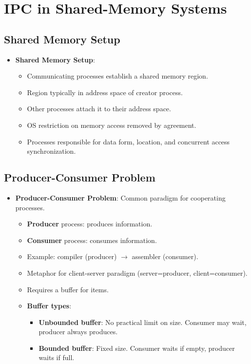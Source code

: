 \section{IPC in Shared-Memory Systems}\label{sec:3.5}

\subsection{Shared Memory Setup}
\begin{itemize}
    \item \textbf{Shared Memory Setup}:
        \begin{itemize}
            \item Communicating processes establish a shared memory region.
            \item Region typically in address space of creator process.
            \item Other processes attach it to their address space.
            \item OS restriction on memory access removed by agreement.
            \item Processes responsible for data form, location, and concurrent access synchronization.
        \end{itemize}
\end{itemize}

\subsection{Producer-Consumer Problem}
\begin{itemize}
    \item \textbf{Producer-Consumer Problem}: Common paradigm for cooperating processes.
        \begin{itemize}
            \item \textbf{Producer} process: produces information.
            \item \textbf{Consumer} process: consumes information.
            \item Example: compiler (producer) $\rightarrow$ assembler (consumer).
            \item Metaphor for client-server paradigm (server=producer, client=consumer).
            \item Requires a buffer for items.
            \item \textbf{Buffer types}:
                \begin{itemize}
                    \item \textbf{Unbounded buffer}: No practical limit on size. Consumer may wait, producer always produces.
                    \item \textbf{Bounded buffer}: Fixed size. Consumer waits if empty, producer waits if full.
                \end{itemize}
        \end{itemize}
\end{itemize}

